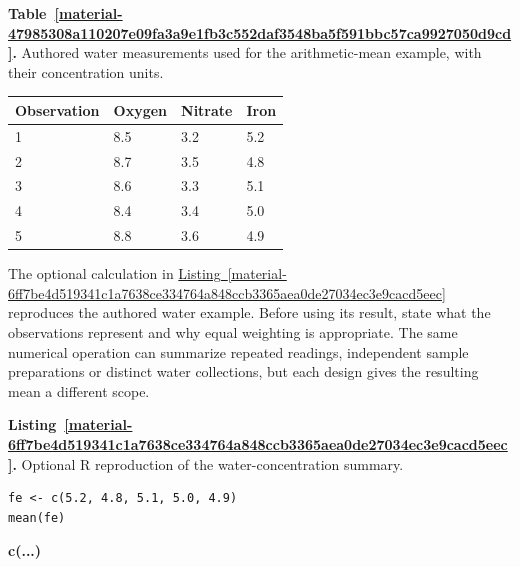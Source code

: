 \documentclass[11pt,a4paper]{article}
\newcounter{listing}
\newcounter{scripttable}
\begin{document}
\par\medskip
{}
\label{material-47985308a110207e09fa3a9e1fb3c552daf3548ba5f591bbc57ca9927050d9cd}
\noindent\textbf{Table~\ref*{material-47985308a110207e09fa3a9e1fb3c552daf3548ba5f591bbc57ca9927050d9cd}.} Authored water measurements used for the arithmetic-mean example, with their concentration units.\par\nopagebreak
\begin{longtable}{@{}p{}p{}p{}p{}@{}}
Observation & Oxygen & Nitrate & Iron \\ \hline
\endhead
1 & 8.5 & 3.2 & 5.2 \\ \hline
2 & 8.7 & 3.5 & 4.8 \\ \hline
3 & 8.6 & 3.3 & 5.1 \\ \hline
4 & 8.4 & 3.4 & 5.0 \\ \hline
5 & 8.8 & 3.6 & 4.9 \\ \hline
\end{longtable}
\medskip

The optional calculation in \hyperref[material-6ff7be4d519341c1a7638ce334764a848ccb3365aea0de27034ec3e9cacd5eec]{Listing~\ref*{material-6ff7be4d519341c1a7638ce334764a848ccb3365aea0de27034ec3e9cacd5eec}} reproduces the authored water example. Before using its result, state what the observations represent and why equal weighting is appropriate. The same numerical operation can summarize repeated readings, independent sample preparations or distinct water collections, but each design gives the resulting mean a different scope.


\par\medskip
{}
\label{material-6ff7be4d519341c1a7638ce334764a848ccb3365aea0de27034ec3e9cacd5eec}
\noindent\textbf{Listing~\ref*{material-6ff7be4d519341c1a7638ce334764a848ccb3365aea0de27034ec3e9cacd5eec}.} Optional R reproduction of the water-concentration summary.\par\nopagebreak
\begin{Verbatim}[fontsize=\footnotesize,breaklines=true,breakanywhere=true]
fe <- c(5.2, 4.8, 5.1, 5.0, 4.9)
mean(fe)
\end{Verbatim}

\par\noindent\textbf{c(...)}
\end{document}
